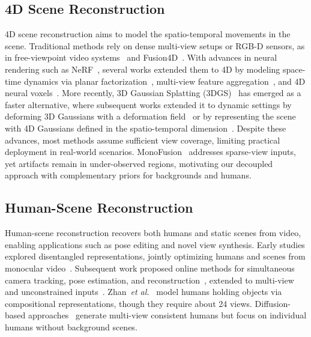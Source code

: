 \documentclass[acmtog]{acmart}
\begin{document}
\subsection{4D Scene Reconstruction}
4D scene reconstruction aims to model the spatio-temporal movements in the scene. Traditional methods rely on dense multi-view setups or RGB-D sensors, as in free-viewpoint video systems~\cite{carranza2003free} and Fusion4D~\cite{dou2016fusion4d}.
With advances in neural rendering such as NeRF~\cite{mildenhall2021nerf}, several works extended them to 4D by modeling space-time dynamics via planar factorization~\cite{fridovich2023k}, multi-view feature aggregation~\cite{li2023dynibar}, and 4D neural voxels~\cite{wu20254d}.
More recently, 3D Gaussian Splatting (3DGS)~\cite{kerbl20233d} has emerged as a faster alternative, where subsequent works extended it to dynamic settings by deforming 3D Gaussians with a deformation field~\cite{luiten2024dynamic, wu20244d, yang2024deformable, huang2024sc} or by representing the scene with 4D Gaussians defined in the spatio-temporal dimension~\cite{li2024spacetime, yang2023gs4d, wang2025freetimegs, duan20244d}.
Despite these advances, most methods assume sufficient view coverage, limiting practical deployment in real-world scenarios.
MonoFusion~\cite{wang2025monofusion} addresses sparse-view inputs, yet artifacts remain in under-observed regions, motivating our decoupled approach with complementary priors for backgrounds and humans.

\subsection{Human-Scene Reconstruction}
Human-scene reconstruction recovers both humans and static scenes from video, enabling applications such as pose editing and novel view synthesis.
Early studies explored disentangled representations, jointly optimizing humans and scenes from monocular video~\cite{kocabas2024hugs,xue2024hsr}.
Subsequent work proposed online methods for simultaneous camera tracking, pose estimation, and reconstruction~\cite{zhang2025odhsr}, extended to multi-view and unconstrained inputs~\cite{kim2025showmak3r,huang2025echoes, moon2024expressive}.
Zhan~\textit{et al.}~\cite{zhan2025towards} model humans holding objects via compositional representations, though they require about 24 views. Diffusion-based approaches~\cite{jin2025diffuman4d, shao2024360} generate multi-view consistent humans but focus on individual humans without background scenes.
\end{document}
